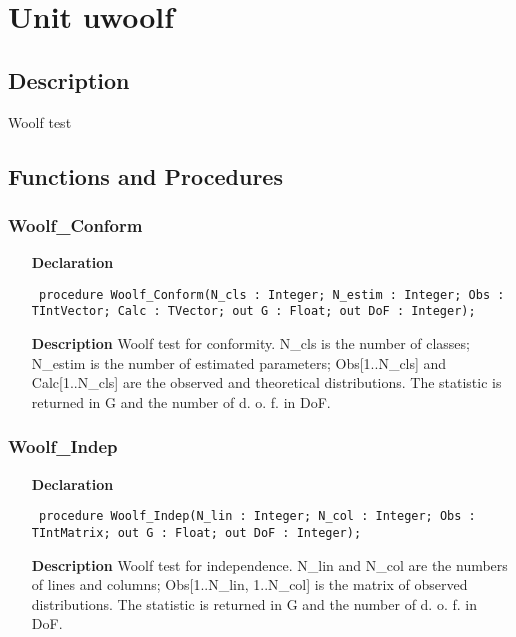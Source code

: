 \documentclass[12pt,a4paper,oneside]{report}
\newcommand{\declarationitem}[1]{\textbf{#1}}
\newcommand{\descriptiontitle}[1]{\textbf{#1}}
\newcommand{\code}[1]{\texttt{#1}}
\begin{document}
\section{Unit uwoolf}
\label{uwoolf}
\subsection{Description}
Woolf test
\subsection{Functions and Procedures}
\subsubsection{Woolf{\_}Conform}
\label{uwoolf-Woolf_Conform}
\begin{itemize}\item[\declarationitem{Declaration}\hfill]
	\begin{flushleft}
		\code{
			procedure Woolf{\_}Conform(N{\_}cls : Integer; N{\_}estim : Integer; Obs : TIntVector; Calc : TVector; out G : Float; out DoF : Integer);}
	\end{flushleft}
	\item[\descriptiontitle{Description}]
	Woolf test for conformity. N{\_}cls is the number of classes; N{\_}estim is the number of estimated parameters; Obs[1..N{\_}cls] and Calc[1..N{\_}cls] are the observed and theoretical distributions. The statistic is returned in G and the number of d. o. f. in DoF.
\end{itemize}
\subsubsection{Woolf{\_}Indep}
\label{uwoolf-Woolf_Indep}
\begin{itemize}\item[\declarationitem{Declaration}\hfill]
	\begin{flushleft}
		\code{
			procedure Woolf{\_}Indep(N{\_}lin : Integer; N{\_}col : Integer; Obs : TIntMatrix; out G : Float; out DoF : Integer);}
	\end{flushleft}
	\item[\descriptiontitle{Description}]
	Woolf test for independence. N{\_}lin and N{\_}col are the numbers of lines and columns; Obs[1..N{\_}lin, 1..N{\_}col] is the matrix of observed distributions. The statistic is returned in G and the number of d. o. f. in DoF.
\end{itemize}
\end{document}
